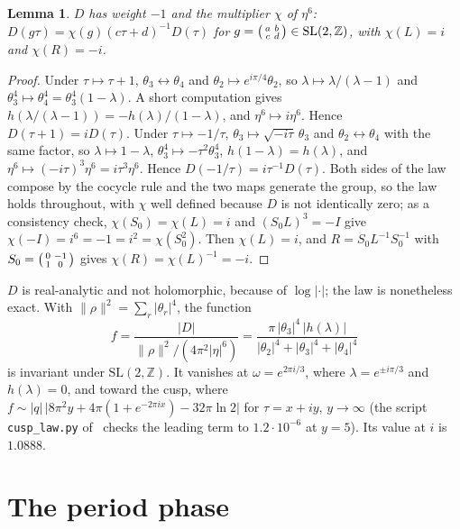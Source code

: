 \documentclass[11pt]{article}
\newtheorem{lemma}[theorem]{Lemma}
\theoremstyle{remark}
\newcommand{\SL}{\mathrm{SL}}
\newcommand{\Z}{\mathbb{Z}}
\begin{document}
\begin{lemma}\label{lem:auto}
$D$ has weight $-1$ and the multiplier $\chi$ of $\eta^6$: $D(g\tau)=\chi(g)(c\tau+d)^{-1}D(\tau)$ for
$g=\begin{psmallmatrix}a&b\\c&d\end{psmallmatrix}\in\SL(2,\Z)$, with $\chi(L)=i$ and $\chi(R)=-i$.
\end{lemma}
\begin{proof}
Under $\tau\mapsto\tau+1$, $\theta_3\leftrightarrow\theta_4$ and $\theta_2\mapsto e^{i\pi/4}\theta_2$, so $\lambda\mapsto\lambda/(\lambda-1)$ and
$\theta_3^4\mapsto\theta_4^4=\theta_3^4(1-\lambda)$. A short computation gives $h(\lambda/(\lambda-1))=-h(\lambda)/(1-\lambda)$, and
$\eta^6\mapsto i\eta^6$. Hence $D(\tau+1)=iD(\tau)$. Under $\tau\mapsto-1/\tau$, $\theta_3\mapsto\sqrt{-i\tau}\,\theta_3$ and
$\theta_2\leftrightarrow\theta_4$ with the same factor, so $\lambda\mapsto1-\lambda$, $\theta_3^4\mapsto-\tau^2\theta_3^4$, $h(1-\lambda)=h(\lambda)$,
and $\eta^6\mapsto(-i\tau)^3\eta^6=i\tau^3\eta^6$. Hence $D(-1/\tau)=i\tau^{-1}D(\tau)$. Both sides of the law compose by the
cocycle rule and the two maps generate the group, so the law holds throughout, with $\chi$ well defined because $D$ is
not identically zero; as a consistency check, $\chi(S_0)=\chi(L)=i$ and $(S_0L)^3=-I$ give $\chi(-I)=i^6=-1=i^2=\chi(S_0^2)$. Then $\chi(L)=i$, and
$R=S_0L^{-1}S_0^{-1}$ with $S_0=\begin{psmallmatrix}0&-1\\1&0\end{psmallmatrix}$ gives $\chi(R)=\chi(L)^{-1}=-i$.
\end{proof}

$D$ is real-analytic and not holomorphic, because of $\log|\cdot|$; the law is nonetheless exact. With
$\|\rho\|^2=\sum_r|\theta_r|^4$, the function
\[
  f=\frac{|D|}{\|\rho\|^2/(4\pi^2|\eta|^6)}=\frac{\pi\,|\theta_3|^4\,|h(\lambda)|}{|\theta_2|^4+|\theta_3|^4+|\theta_4|^4}
\]
is invariant under $\SL(2,\Z)$. It vanishes at $\omega=e^{2\pi i/3}$, where $\lambda=e^{\pm i\pi/3}$ and $h(\lambda)=0$, and toward the
cusp, where $f\sim|q|\,\bigl|8\pi^2y+4\pi(1+e^{-2\pi ix})-32\pi\ln2\bigr|$ for $\tau=x+iy$, $y\to\infty$ (the script
\texttt{cusp\_law.py} of~\cite{OriginAxiomRepo} checks the leading term to $1.2\cdot10^{-6}$ at $y=5$). Its value at $i$ is
$1.0888$.

\section{The period phase}\label{sec:phase}
\end{document}
